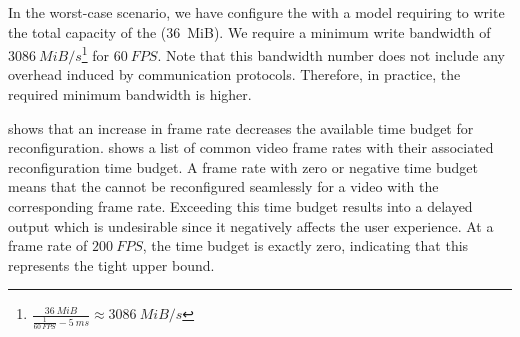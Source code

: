 In the worst-case scenario, we have configure the \graicore{} with a model requiring to write the total capacity of the \graicore{} (\SI{36}{MiB}).
We require a minimum write bandwidth of $\SI{3086}{MiB/s}$\footnote{$\frac{\SI{36}{MiB}}{\frac{1}{\SI{60}{FPS}} - \SI{5}{ms}} \approx \SI{3086}{MiB/s}$} for $\SI{60}{FPS}$.
Note that this bandwidth number does not include any overhead induced by communication protocols. Therefore, in practice, the required minimum bandwidth is higher. 

 shows that an increase in frame rate decreases the available time budget for reconfiguration.
 shows a list of common video frame rates with their associated reconfiguration time budget.
A frame rate with zero or negative time budget means that the \graicore{} cannot be reconfigured seamlessly for a video with the corresponding frame rate.
Exceeding this time budget results into a delayed output which is undesirable since it negatively affects the user experience.
At a frame rate of $\SI{200}{FPS}$, the time budget is exactly zero, indicating that this represents the tight upper bound.

%     



